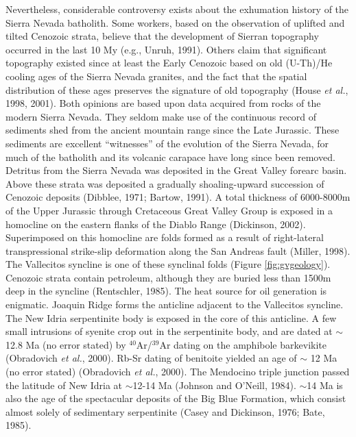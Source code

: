 \documentclass[11pt,twoside]{article}
\begin{document}
Nevertheless,  considerable controversy  exists  about the  exhumation
history of  the Sierra  Nevada batholith. Some  workers, based  on the
observation of  uplifted and tilted Cenozoic strata,  believe that the
development of  Sierran topography occurred  in the last 10  My (e.g.,
Unruh, 1991).  Others claim  that significant topography existed since
at least the Early Cenozoic based on old (U-Th)/He cooling ages of the
Sierra Nevada granites, and the  fact that the spatial distribution of
these ages  preserves the signature  of old topography (House  {\it et
al.}, 1998,  2001).  Both opinions  are based upon data  acquired from
rocks  of  the modern  Sierra  Nevada. They  seldom  make  use of  the
continuous record  of sediments shed  from the ancient  mountain range
since the Late Jurassic.   These sediments are excellent ``witnesses''
of the evolution  of the Sierra Nevada, for much  of the batholith and
its volcanic carapace have long since been removed.\\

Detritus  from the  Sierra Nevada  was deposited  in the  Great Valley
forearc  basin.    Above  these  strata  was   deposited  a  gradually
shoaling-upward  succession  of   Cenozoic  deposits  (Dibblee,  1971;
Bartow, 1991).  A total thickness  of 6000-8000m of the Upper Jurassic
through Cretaceous Great Valley Group is exposed in a homocline on the
eastern flanks of the Diablo Range (Dickinson, 2002).  Superimposed on
this  homocline  are  folds   formed  as  a  result  of  right-lateral
transpressional  strike-slip deformation along  the San  Andreas fault
(Miller,  1998).  The Vallecitos  syncline is  one of  these synclinal
folds (Figure \ref{fig:gvgeology}). Cenozoic strata contain petroleum,
although  they  are  buried  less  than 1500m  deep  in  the  syncline
(Rentschler, 1985).  The heat  source for oil generation is enigmatic.
Joaquin Ridge forms the anticline adjacent to the Vallecitos syncline.
The  New  Idria serpentinite  body  is exposed  in  the  core of  this
anticline.   A  few  small  intrusions  of syenite  crop  out  in  the
serpentinite body, and are dated at $\sim$12.8 Ma (no error stated) by
$^{40}$Ar/$^{39}$Ar  dating on  the amphibole  barkevikite (Obradovich
{\it  et al.},  2000). Rb-Sr  dating of  benitoite yielded  an  age of
$\sim$ 12 Ma  (no error stated) (Obradovich {\it  et al.}, 2000).  The
Mendocino  triple  junction  passed  the  latitude  of  New  Idria  at
$\sim$12-14 Ma (Johnson  and O'Neill, 1984).  $\sim$14 Ma  is also the
age  of the  spectacular deposits  of  the Big  Blue Formation,  which
consist   almost  solely  of   sedimentary  serpentinite   (Casey  and
Dickinson, 1976; Bate, 1985).\\
\end{document}
